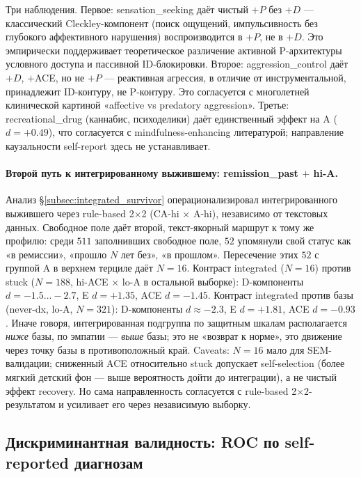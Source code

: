 Три наблюдения. Первое: sensation\_seeking даёт чистый $+P$ без $+D$ --- классический Cleckley-компонент (поиск ощущений, импульсивность без глубокого аффективного нарушения) воспроизводится в $+P$, не в $+D$. Это эмпирически поддерживает теоретическое различение активной P-архитектуры условного доступа и пассивной ID-блокировки. Второе: aggression\_control даёт $+D$, $+$ACE, но не $+P$ --- реактивная агрессия, в отличие от инструментальной, принадлежит ID-контуру, не P-контуру. Это согласуется с многолетней клинической картиной «affective vs predatory aggression». Третье: recreational\_drug (каннабис, психоделики) даёт единственный эффект на A ($d = +0.49$), что согласуется с mindfulness-enhancing литературой; направление каузальности self-report здесь не устанавливает.

\paragraph{Второй путь к интегрированному выжившему: remission\_past $+$ hi-A.} Анализ §\ref{subsec:integrated_survivor} операционализировал интегрированного выжившего через rule-based 2$\times$2 (CA-hi $\times$ A-hi), независимо от текстовых данных. Свободное поле даёт второй, текст-якорный маршрут к тому же профилю: среди $511$ заполнивших свободное поле, $52$ упомянули свой статус как «в ремиссии», «прошло $N$ лет без», «в прошлом». Пересечение этих $52$ с группой A в верхнем терциле даёт $N = 16$. Контраст integrated ($N = 16$) против stuck ($N = 188$, hi-ACE $\times$ lo-A в остальной выборке): D-компоненты $d = -1.5 \dots -2.7$, E $d = +1.35$, ACE $d = -1.45$. Контраст integrated против базы (never-dx, lo-A, $N = 321$): D-компоненты $d \approx -2.3$, E $d = +1.81$, ACE $d = -0.93$. Иначе говоря, интегрированная подгруппа по защитным шкалам располагается \emph{ниже} базы, по эмпатии --- \emph{выше} базы; это не «возврат к норме», это движение через точку базы в противоположный край. Caveats: $N = 16$ мало для SEM-валидации; сниженный ACE относительно stuck допускает self-selection (более мягкий детский фон --- выше вероятность дойти до интеграции), а не чистый эффект recovery. Но сама направленность согласуется с rule-based 2$\times$2-результатом и усиливает его через независимую выборку.

\subsection{Дискриминантная валидность: ROC по self-reported диагнозам}
\label{subsec:roc_validity}


